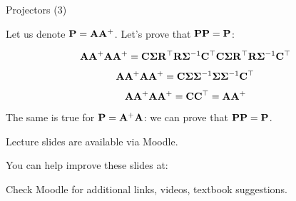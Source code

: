 \documentclass{beamer}
\begin{document}
\begin{frame}{Projectors (3)}
	\begin{flushleft}
		
		Let us denote $\mathbf{P} = \mathbf{A}\mathbf{A}^+$. 
		Let's prove that $\mathbf{P}\mathbf{P} = \mathbf{P}$:
		
		\begin{equation}
			\mathbf{A} \mathbf{A}^+ \mathbf{A} \mathbf{A}^+ = 
			\mathbf{C} \mathbf{\Sigma} \mathbf{R}^\top 
			\mathbf{R} \mathbf{\Sigma}^{-1} \mathbf{C}^\top 
			\mathbf{C} \mathbf{\Sigma} \mathbf{R}^\top 
			\mathbf{R} \mathbf{\Sigma}^{-1} \mathbf{C}^\top
		\end{equation}
	
		\begin{equation}
	\mathbf{A} \mathbf{A}^+ \mathbf{A} \mathbf{A}^+ = 
	\mathbf{C} \mathbf{\Sigma} \mathbf{\Sigma}^{-1}\mathbf{\Sigma} \mathbf{\Sigma}^{-1} \mathbf{C}^\top
		\end{equation}	
	
\begin{equation}
\mathbf{A} \mathbf{A}^+ \mathbf{A} \mathbf{A}^+ = 
\mathbf{C} \mathbf{C}^\top =
\mathbf{A} \mathbf{A}^+
\end{equation}		
		
		The same is true for $\mathbf{P} = \mathbf{A}^+\mathbf{A}$: we can prove that $\mathbf{P}\mathbf{P} = \mathbf{P}$.
		
	\end{flushleft}
\end{frame}




\begin{frame}
	\centerline{Lecture slides are available via Moodle.}
	\bigskip
	\centerline{You can help improve these slides at:}
	\centerline{
		\mygit
	}
	\bigskip
	
	\textcolor{black}{}
	\bigskip
	
	
	\centerline{Check Moodle for additional links, videos, textbook suggestions.}
\end{frame}
\end{document}
